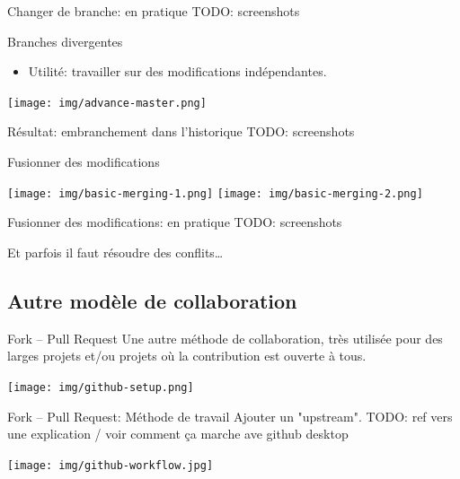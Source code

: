 \documentclass{beamer}
\begin{document}
\begin{frame}{Changer de branche: en pratique}
    TODO: screenshots
\end{frame}

\begin{frame}{Branches divergentes}
    \begin{itemize}
        \item Utilité: travailler sur des modifications indépendantes.
    \end{itemize}
    \begin{center}
        \texttt{[image: img/advance-master.png]}
    \end{center}
\end{frame}

\begin{frame}{Résultat: embranchement dans l'historique}
    TODO: screenshots
\end{frame}

\begin{frame}{Fusionner des modifications}
\begin{center}
    \texttt{[image: img/basic-merging-1.png]}
    \texttt{[image: img/basic-merging-2.png]}
\end{center}
\end{frame}

\begin{frame}{Fusionner des modifications: en pratique}
    TODO: screenshots

    Et parfois il faut résoudre des conflits\dots
\end{frame}


\subsection{Autre modèle de collaboration}

\begin{frame}{Fork -- Pull Request}
    Une autre méthode de collaboration, très utilisée pour des larges projets
    et/ou projets o\`u la contribution est ouverte à tous.
    \begin{center}
        \texttt{[image: img/github-setup.png]}
    \end{center}
\end{frame}

\begin{frame}{Fork -- Pull Request: Méthode de travail}
    Ajouter un "upstream". TODO: ref vers une explication / voir comment ça marche ave github desktop
    \begin{center}
        \texttt{[image: img/github-workflow.jpg]}
    \end{center}
\end{frame}
\end{document}
